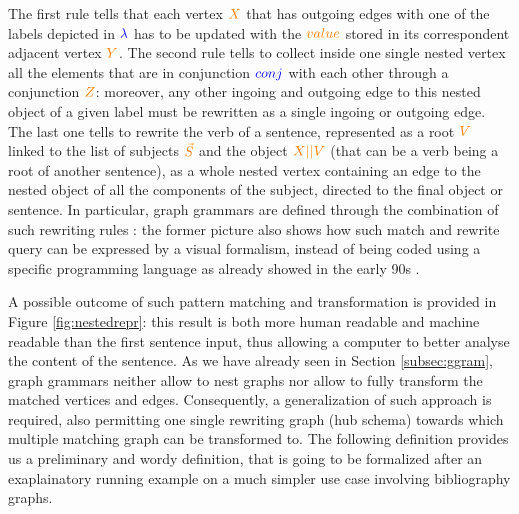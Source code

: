 	The first rule tells that each vertex $\color{orange}X$ that has outgoing edges with one of the labels depicted in $\color{blue}\lambda$ has to be updated with the $\color{orange} value$ stored in its correspondent adjacent vertex $\color{orange} Y$. The second rule tells to collect inside one single nested vertex all the elements that are in conjunction $\color{blue}conj$ with each other through a conjunction $\color{orange} Z$: moreover, any other ingoing and outgoing edge to this nested object of a given label  must be rewritten as a single ingoing or outgoing edge. The last one tells to rewrite the verb of a sentence, represented as a root $\color{orange} V$ linked to the list of subjects $\color{orange} \vec{S}$ and the object $\color{orange}X||V$ (that can be a verb being a root of another sentence), as a whole nested vertex containing an edge to the nested object of all the components of the subject, directed to the final object or sentence. 
	In particular,  graph grammars are defined through the combination of such rewriting rules   \cite{GraphLogAggr,Plump1998Term}: the former  picture also shows how such match and rewrite query can be expressed by a visual formalism, instead of being coded using a specific programming language as already showed in the early 90s \cite{GraphLogAggr}.
	
	
	A possible outcome of such pattern matching and transformation is provided in Figure \ref{fig:nestedrepr}: this  result is both more human readable and machine readable than the first sentence input, thus allowing a computer to better analyse the content of the sentence. As we have already seen in Section \vref{subsec:ggram}, graph grammars neither allow to nest graphs nor allow to fully transform the matched vertices and edges. Consequently, a generalization of such approach is required, also permitting one single rewriting graph (hub schema) towards which multiple matching graph can be transformed to. The following definition provides us a preliminary and wordy definition, that is going to be formalized after an exaplainatory running example on a much simpler use case involving bibliography graphs. 
	
	
	








